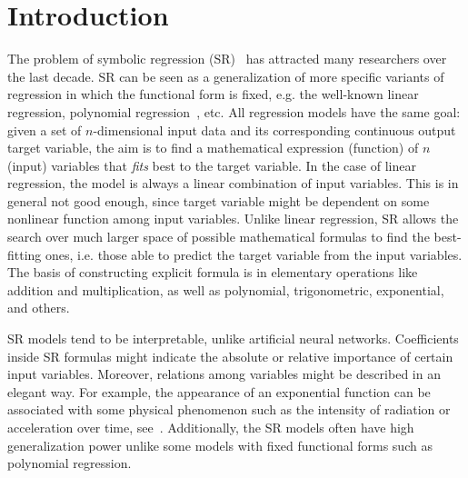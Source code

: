 \documentclass{bmcart}
\begin{document}

	\section{Introduction}\label{sec:introduction}

The problem of symbolic regression (SR)~\cite{billard2002symbolic} has attracted many researchers over the last decade. SR can be seen as a generalization of more specific variants of regression in which the functional form is fixed, e.g. the well-known linear regression, polynomial regression~\cite{stimson1978interpreting}, etc. All regression models have the same goal: given a set of $n$-dimensional input data and its corresponding continuous output target variable, the aim is to find a  mathematical expression (function) of $n$ (input) variables that   \emph{fits} best to the target variable.  %
In the case of linear regression, the model is always a linear combination of input variables. This is in general not good enough, since target variable might be dependent on some nonlinear function among input variables. Unlike linear regression, SR allows the search over much larger space of possible mathematical formulas to find the best-fitting ones, i.e. those able to predict the target variable from the input variables. The basis of constructing explicit formula is in elementary operations like addition and multiplication, as well as polynomial, trigonometric, exponential, and others.  

SR models tend to be interpretable, unlike artificial neural networks. Coefficients inside SR formulas might indicate the absolute or relative importance of certain input variables. Moreover, relations among variables might be described in an elegant way. For example, the appearance of an exponential function can be associated with some physical phenomenon such as the intensity of radiation or acceleration over time, see~\cite{udrescu2020ai}. Additionally, the SR models often have high generalization power unlike some models with fixed functional forms such as polynomial regression. 
\end{document}
